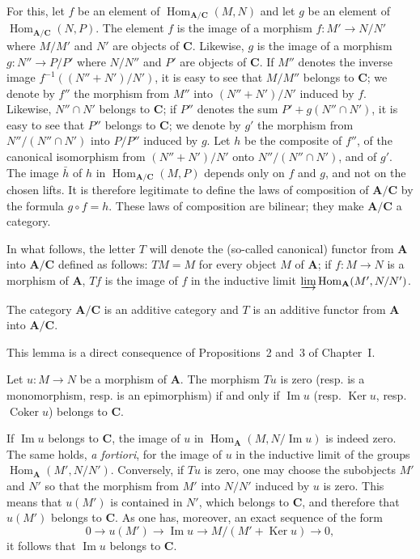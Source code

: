 For this, let $f$ be an element of
$\operatorname{Hom}_{\mathbf A/\mathbf C}(M,N)$ and let $g$ be an
element of $\operatorname{Hom}_{\mathbf A/\mathbf C}(N,P)$. The element
$f$ is the image of a morphism $f:M'\to N/N'$ where $M/M'$ and $N'$ are
objects of $\mathbf C$. Likewise, $g$ is the image of a morphism
$g:N''\to P/P'$ where $N/N''$ and $P'$ are objects of $\mathbf C$. If
$M''$ denotes the inverse image $f^{-1}((N''+N')/N')$, it is easy to see
that $M/M''$ belongs to $\mathbf C$; we denote by $f''$ the morphism from
$M''$ into $(N''+N')/N'$ induced by $f$. Likewise, $N''\cap N'$
belongs to $\mathbf C$; if $P''$ denotes the sum
$P'+g(N''\cap N')$, it is easy to see that $P''$ belongs to
$\mathbf C$; we denote by $g'$ the morphism from
$N''/(N''\cap N')$ into $P/P''$ induced by $g$. Let $h$ be the
composite of $f''$, of the canonical isomorphism from
$(N''+N')/N'$ onto $N''/(N''\cap N')$, and of $g'$. The image
$\bar h$ of $h$ in
$\operatorname{Hom}_{\mathbf A/\mathbf C}(M,P)$ depends only on
$f$ and $g$, and not on the chosen lifts. It is therefore legitimate to
define the laws of composition of $\mathbf A/\mathbf C$ by the formula
$g\circ f=h$. These laws of composition are bilinear; they make
$\mathbf A/\mathbf C$ a category.

In what follows, the letter $T$ will denote the (so-called canonical)
functor from $\mathbf A$ into $\mathbf A/\mathbf C$ defined as follows:
$TM=M$ for every object $M$ of $\mathbf A$; if $f:M\to N$ is a morphism
of $\mathbf A$, $Tf$ is the image of $f$ in the inductive limit
$\varinjlim \operatorname{Hom}_{\mathbf A}(M',N/N')$.

\begin{lemma}
The category $\mathbf A/\mathbf C$ is an additive category and $T$ is an
additive functor from $\mathbf A$ into $\mathbf A/\mathbf C$.
\end{lemma}

This lemma is a direct consequence of Propositions~2 and~3 of
Chapter~I.

\begin{lemma}
Let $u:M\to N$ be a morphism of $\mathbf A$. The morphism $Tu$ is zero
(resp. is a monomorphism, resp. is an epimorphism) if and only if
$\operatorname{Im}u$ (resp. $\operatorname{Ker}u$, resp.
$\operatorname{Coker}u$) belongs to $\mathbf C$.
\end{lemma}

If $\operatorname{Im}u$ belongs to $\mathbf C$, the image of $u$ in
$\operatorname{Hom}_{\mathbf A}(M,N/\operatorname{Im}u)$ is indeed zero.
The same holds, \emph{a fortiori}, for the image of $u$ in the inductive
limit of the groups $\operatorname{Hom}_{\mathbf A}(M',N/N')$.
Conversely, if $Tu$ is zero, one may choose the subobjects $M'$ and
$N'$ so that the morphism from $M'$ into $N/N'$ induced by $u$ is
zero. This means that $u(M')$ is contained in $N'$, which belongs to
$\mathbf C$, and therefore that $u(M')$ belongs to $\mathbf C$. As one
has, moreover, an exact sequence of the form
\[
0 \to u(M') \to \operatorname{Im}u \to M/(M'+\operatorname{Ker}u) \to 0,
\]
it follows that $\operatorname{Im}u$ belongs to $\mathbf C$.

